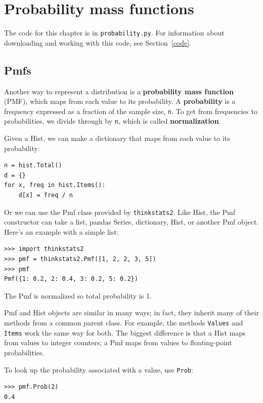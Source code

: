 \documentclass[12pt]{book}
\begin{document}
\chapter{Probability mass functions}

The code for this chapter is in {\tt probability.py}.
For information about downloading and
working with this code, see Section~\ref{code}.


\section{Pmfs}

Another way to represent a distribution is a {\bf probability mass
  function} (PMF), which maps from each value to its probability.  A
{\bf probability} is a frequency expressed as a fraction of the sample
size, {\tt n}.  To get from frequencies to probabilities, we divide
through by {\tt n}, which is called {\bf normalization}.

Given a Hist, we can make a dictionary that maps from each
value to its probability: 
%
\begin{verbatim}
n = hist.Total()
d = {}
for x, freq in hist.Items():
    d[x] = freq / n
\end{verbatim}
%
Or we can use the Pmf class provided by {\tt thinkstats2}.
Like Hist, the Pmf constructor can take a list, pandas
Series, dictionary, Hist, or another Pmf object.  Here's an example
with a simple list:
%
\begin{verbatim}
>>> import thinkstats2
>>> pmf = thinkstats2.Pmf([1, 2, 2, 3, 5])
>>> pmf
Pmf({1: 0.2, 2: 0.4, 3: 0.2, 5: 0.2})
\end{verbatim}

The Pmf is normalized so total probability is 1.

Pmf and Hist objects are similar in many ways; in fact, they inherit
many of their methods from a common parent class.  For example, the
methods {\tt Values} and {\tt Items} work the same way for both.  The
biggest difference is that a Hist maps from values to integer
counters; a Pmf maps from values to floating-point probabilities.

To look up the probability associated with a value, use {\tt Prob}:
%
\begin{verbatim}
>>> pmf.Prob(2)
0.4
\end{verbatim}
\end{document}

